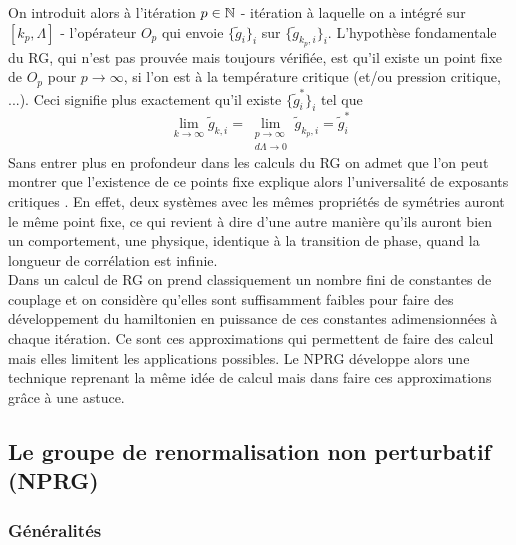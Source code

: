 \documentclass[10pt]{article}
\begin{document}
\begin{multicols}{2}
 On introduit alors à l'itération $p \in \mathbb{N}$ - itération à laquelle on a intégré sur $[k_p, \Lambda]$ - l'opérateur $O_p$ qui envoie $\{\tilde{g}_i\}_i$ sur $\{\tilde{g}_{k_p,i}\}_i$. L'hypothèse fondamentale du RG, qui n'est pas prouvée mais toujours vérifiée, est qu'il existe un point fixe de $O_p$ pour $p \to \infty$, si l'on est à la température critique (et/ou pression critique, ...). Ceci signifie plus exactement qu'il existe $\{\tilde{g}^*_i\}_i$ tel que 
 \begin{equation}
 	\lim\limits_{k \rightarrow \infty}  \tilde{g}_{k,i} = \lim\limits_{\substack{p \to \infty \\ d\Lambda \to 0 }}  \tilde{g}_{k_p,i} =  \tilde{g}^*_i
 \end{equation} 
Sans entrer plus en profondeur dans les calculs du RG on admet que l'on peut montrer que l'existence de ce points fixe explique alors l'universalité de exposants critiques \cite{Delamotte2012}. En effet, deux systèmes avec les mêmes propriétés de symétries auront le même point fixe, ce qui revient à dire d'une autre manière qu'ils auront bien un comportement, une physique, identique à la transition de phase, quand la longueur de corrélation est infinie. \\
 
Dans un calcul de RG on prend classiquement un nombre fini de constantes de couplage et on considère qu'elles sont suffisamment faibles pour faire des développement du hamiltonien en puissance de ces constantes adimensionnées à chaque itération. Ce sont ces approximations qui permettent de faire des calcul mais elles limitent les applications possibles. Le NPRG développe alors une technique reprenant la même idée de calcul mais dans faire ces approximations grâce à une astuce.

\vspace*{11pt}
\subsection{Le groupe de renormalisation non perturbatif (NPRG)}
\subsubsection{Généralités}


\end{multicols}
\end{document}
